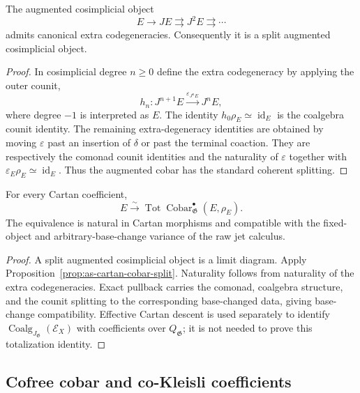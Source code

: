 \begin{proposition}
\label{prop:as-cartan-cobar-split}
The augmented cosimplicial object
\[
    E\longrightarrow
    J E\rightrightarrows J^2E\rightrightarrows\cdots
\]
admits canonical extra codegeneracies.  Consequently it is a split augmented
cosimplicial object.
\end{proposition}

\begin{proof}
In cosimplicial degree $n\geq0$ define the extra codegeneracy by applying the
outer counit,
\[
    h_n:
    J^{n+1}E
    \xrightarrow{\varepsilon_{J^nE}}
    J^nE,
\]
where degree $-1$ is interpreted as $E$.  The identity
$h_0\rho_E\simeq\operatorname{id}_E$ is the coalgebra counit identity.  The
remaining extra-degeneracy identities are obtained by moving
$\varepsilon$ past an insertion of $\delta$ or past the terminal coaction.
They are respectively the comonad counit identities and the naturality of
$\varepsilon$ together with $\varepsilon_E\rho_E\simeq\operatorname{id}_E$.
Thus the augmented cobar has the standard coherent splitting.
\end{proof}

\begin{theorem}
\label{thm:as-cobar-descent}
For every Cartan coefficient,
\[
\boxed{
    E
    \xrightarrow{\sim}
    \operatorname*{Tot}
    \operatorname{Cobar}_{\mathfrak G}^{\bullet}(E,\rho_E).
}
\]
The equivalence is natural in Cartan morphisms and compatible with the
fixed-object and arbitrary-base-change variance of the raw jet calculus.
\end{theorem}

\begin{proof}
A split augmented cosimplicial object is a limit diagram.  Apply
Proposition~\ref{prop:as-cartan-cobar-split}.  Naturality follows from
naturality of the extra codegeneracies.  Exact pullback carries the comonad,
coalgebra structure, and the counit splitting to the corresponding
base-changed data, giving base-change compatibility.  Effective Cartan
descent is used separately to identify
$\operatorname{Coalg}_{J_{\mathfrak G}}(\mathcal E_X)$ with coefficients over
$Q_{\mathfrak G}$; it is not needed to prove this totalization identity.
\end{proof}

\subsection{Cofree cobar and co-Kleisli coefficients}

